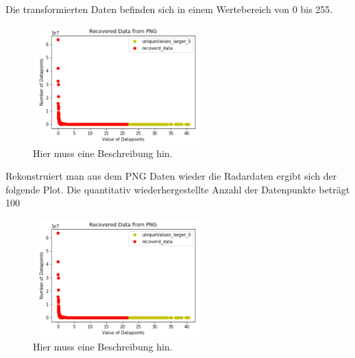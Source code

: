 Die transformierten Daten befinden sich in einem Wertebereich von 0 bis 255.  

\begin{figure}[H]
 \centering
 \includegraphics[width=0.6\textwidth,angle=0]{abb/datenaufbereitung_beispiel}
 \caption[Datenaufbereitung]{Hier muss eine Beschreibung hin.}
\label{fig:datenaufbereitung}
\end{figure}

Rekonstruiert man aus dem PNG Daten wieder die Radardaten ergibt sich der folgende Plot. Die quantitativ wiederhergestellte Anzahl der Datenpunkte beträgt 100%

\begin{figure}[H]
 \centering
 \includegraphics[width=0.6\textwidth,angle=0]{abb/datenaufbereitung_beispiel}
 \caption[Datenaufbereitung]{Hier muss eine Beschreibung hin.}
\label{fig:datenaufbereitung}
\end{figure}